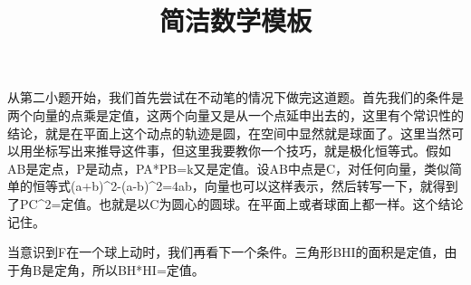 \documentclass[a4paper,10pt]{ctexart}
\begin{document}
\title{简洁数学模板}
\maketitle

从第二小题开始，我们首先尝试在不动笔的情况下做完这道题。首先我们的条件是两个向量的点乘是定值，这两个向量又是从一个点延申出去的，这里有个常识性的结论，就是在平面上这个动点的轨迹是圆，在空间中显然就是球面了。这里当然可以用坐标写出来推导这件事，但这里我要教你一个技巧，就是极化恒等式。假如AB是定点，P是动点，PA*PB=k又是定值。设AB中点是C，对任何向量，类似简单的恒等式(a+b)^2-(a-b)^2=4ab，向量也可以这样表示，然后转写一下，就得到了PC^2=定值。也就是以C为圆心的圆球。在平面上或者球面上都一样。这个结论记住。

当意识到F在一个球上动时，我们再看下一个条件。三角形BHI的面积是定值，由于角B是定角，所以BH*HI=定值。
\end{document}
